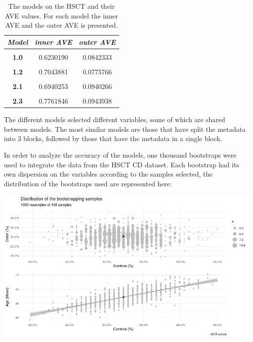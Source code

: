 \documentclass[
  12pt,
  a4paper,
  twoside,
  openright]{book}
\let\origfigure\figure
\let\endorigfigure\endfigure
\renewenvironment{figure}[1][2] {
    \expandafter\origfigure\expandafter[!ht]
} {
    \endorigfigure
}
\begin{document}
\begin{table}[H]

\caption[The models on the HSCT and their AVE values.]{\label{tab:hsct-models-ave}The models on the HSCT and their AVE values. For each model the inner AVE and the outer AVE is presented.}
\centering
\begin{tabular}[t]{|>{}c|c|>{}c|}
\hline
\em{\textbf{Model}} & \em{\textbf{inner AVE}} & \em{\textbf{outer AVE}}\\
\hline
\textbf{\cellcolor{gray!6}{0.0}} & \cellcolor{gray!6}{0.3999234} & \cellcolor{gray!6}{0.1001689}\\
\hline
\textbf{1.0} & 0.6230190 & 0.0842333\\
\hline
\textbf{\cellcolor{gray!6}{1.1}} & \cellcolor{gray!6}{0.5678189} & \cellcolor{gray!6}{0.0848714}\\
\hline
\textbf{1.2} & 0.7043881 & 0.0775766\\
\hline
\textbf{\cellcolor{gray!6}{2.0}} & \cellcolor{gray!6}{0.2517363} & \cellcolor{gray!6}{0.0982050}\\
\hline
\textbf{2.1} & 0.6940253 & 0.0940266\\
\hline
\textbf{\cellcolor{gray!6}{2.2}} & \cellcolor{gray!6}{0.8187640} & \cellcolor{gray!6}{0.0941628}\\
\hline
\textbf{2.3} & 0.7761846 & 0.0943938\\
\hline
\end{tabular}
\end{table}

The different models selected different variables, some of which are shared between models.
The most similar models are those that have split the metadata into 3 blocks, followed by those that have the metadata in a single block.

In order to analyze the accuracy of the models, one thousand bootstraps were used to integrate the data from the HSCT CD dataset.
Each bootstrap had its own dispersion on the variables according to the samples selected, the distribution of the bootstraps used are represented here:

\begin{figure}
\includegraphics[width=1\linewidth]{images/hsct-bootstrap-characteristics} \caption[Characteristics of the samples of  HSCT bootstraps.]{Dispersion of the bootstraped samples on age and percentage of colon and controls samples.}\label{fig:hsct-bootstrap-quality}
\end{figure}
\end{document}
